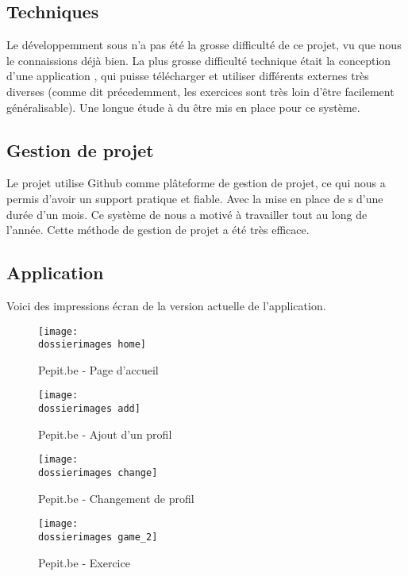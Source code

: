 \subsection{Techniques}
Le développemment sous \android{} n'a pas été la grosse difficulté de ce projet, vu que nous le connaissions déjà bien. La plus grosse difficulté technique était la conception d'une application \android{}, qui puisse télécharger et utiliser différents \plugins{} externes très diverses (comme dit précedemment, les exercices sont très loin d'être facilement généralisable). Une longue étude à du être mis en place pour ce système. 

\subsection{Gestion de projet}
Le projet utilise Github comme plâteforme de gestion de projet, ce qui nous a permis d'avoir un support pratique et fiable.
Avec la mise en place de \sprint s d'une durée d'un mois. Ce système de \sprint{} nous a motivé à travailler tout au long de l'année. Cette méthode de gestion de projet a été très efficace.


\subsection{Application}
Voici des impressions écran de la version actuelle de l'application.
\begin{figure}[H]
   	\begin{minipage}[c]{.46\linewidth}
		\texttt{[image: \\dossierimages home]} 
		\caption{Pepit.be - Page d'accueil}
		\label{Pepit.be - Page d'accueil}
   	\end{minipage} \hfill
  	\begin{minipage}[c]{.46\linewidth}
      	\texttt{[image: \\dossierimages add]}
     	\caption{Pepit.be - Ajout d'un profil}
		\label{Pepit.be - Ajout d'un profil}
   	\end{minipage}
\end{figure}
\begin{figure}[H]
   	\begin{minipage}[c]{.46\linewidth}
		\texttt{[image: \\dossierimages change]} 
		\caption{Pepit.be - Changement de profil}
		\label{Pepit.be - Changement de profil}
   	\end{minipage} \hfill
  	\begin{minipage}[c]{.46\linewidth}
      	\texttt{[image: \\dossierimages game\_2]}
     	\caption{Pepit.be - Exercice}
		\label{Pepit.be - Exercice}
   	\end{minipage}
\end{figure}
